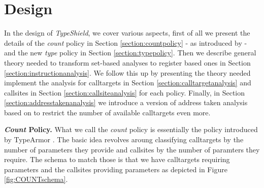\section{Design}
\label{chapter:Design}

In the design of \textit{TypeShield}, we cover various aspects, first of all we present the details of the 
\emph{count} policy in Section \ref{section:countpolicy} - as introduced by \cite{veen:typearmor} - 
and the new \emph{type} policy in Section \ref{section:typepolicy}. Then we describe general 
theory needed to transform set-based analyses to register based ones in Section \ref{section:instructionanalysis}. 
We follow this up by presenting the theory needed  implement the analysis for calltargets  in 
Section \ref{section:calltargetanalysis} and  callsites in Section \ref{section:callsiteanalysis} 
for each policy. Finally, in Section \ref{section:addresstakenanalysis} we introduce a version of 
address taken analysis based on \cite{mingwei:sekar} to restrict the number of available calltargets even more. 

\textbf{\emph{Count} Policy.}
\label{section:countpolicy}
What we call the \emph{count} policy is essentially the policy introduced by TypeArmor \cite{veen:typearmor}. 
The basic idea revolves aroung classifying calltargets by the number of parameters they provide and callsites 
by the number of paramters they require. The schema to match those is that we have calltargets requiring 
parameters and the callsites providing parameters as depicted in Figure \ref{fig:COUNTschema}.

